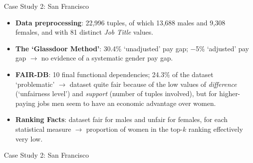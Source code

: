 \documentclass[usenames,dvipsnames]{beamer}
\begin{document}
    
    \begin{frame}{Case Study 2: San Francisco}
        \begin{itemize}
            \item \textbf{Data preprocessing}: 22,996 tuples, of which 13,688 males and 9,308 females, and with 81 distinct \textit{Job Title} values.\newline
            \item \textbf{The `Glassdoor Method'}: 30.4\% `unadjusted' pay gap; \(-\)5\% `adjusted' pay gap $\rightarrow$ no evidence of a systematic gender pay gap.
            \item \textbf{FAIR-DB}: 10 final functional dependencies; 24.3\% of the dataset `problematic' $\rightarrow$ dataset quite fair because of the low values of \textit{difference} (`unfairness level') and \textit{support} (number of tuples involved), but for higher-paying jobs men seem to have an economic advantage over women.
            \item \textbf{Ranking Facts}: dataset fair for males and unfair for females, for each statistical measure $\rightarrow$ proportion of women in the top-\(k\) ranking effectively very low.
        \end{itemize}
    \end{frame}
    
    
    \begin{frame}{Case Study 2: San Francisco}
        \begin{figure}
            \hfill
        \end{figure}
    \end{frame}
    
\end{document}
